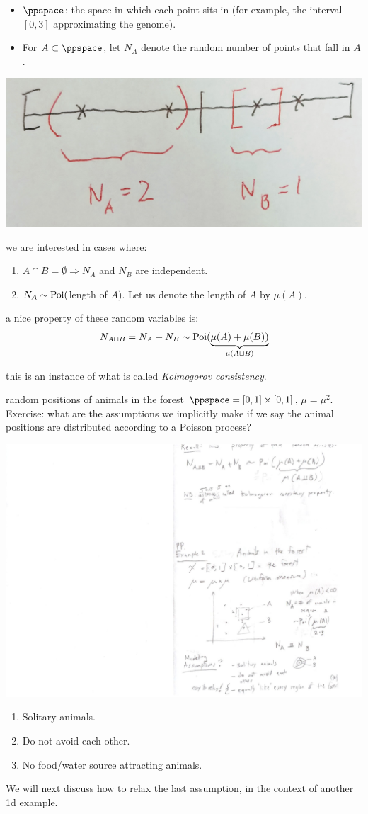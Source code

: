 \documentclass{article}
\begin{document}
\begin{itemize}
  \item $\ppspace$: the space in which each point sits in (for example, the interval $[0, 3]$ approximating the genome).
  \item For $A \subset \ppspace$, let $N_A$ denote the random number of points that fall in $A$.
\end{itemize}
\begin{center}
	\includegraphics[width=0.5\linewidth]{figures/pp-with-intervals} 
\end{center}

 we are interested in cases where:
\begin{enumerate}
  \item $A \cap B = \emptyset \Longrightarrow N_A$ and $N_B$ are independent.
  \item $N_A \sim \operatorname{Poi}($length of $A)$. Let us denote the length of $A$ by $\mu(A)$.
\end{enumerate}

 a nice property of these random variables is:
\[ N_{A\sqcup B} = N_A + N_B \sim \operatorname{Poi}(\underbrace{\mu(A) + \mu(B))}_{\mu(A\sqcup B)} \]

 this is an instance of what is called \emph{Kolmogorov consistency}.

 random positions of animals in the forest $\ppspace = [0,1]\times[0,1]$, $\mu = \mu^2$. Exercise: what are the assumptions we implicitly make if we say the animal positions are distributed according to a Poisson process?
\begin{center}
	\includegraphics[width=0.5\linewidth]{figures/pp-2d} 
\end{center}
\begin{enumerate}
	\item Solitary animals.
	\item Do not avoid each other.
	\item No food/water source attracting animals.
\end{enumerate}
We will next discuss how to relax the last assumption, in the context of another 1d example. 
\end{document}
